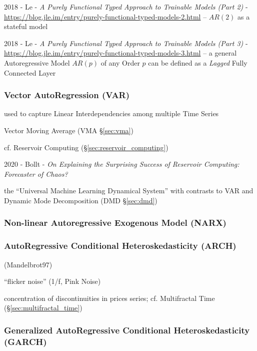 2018 - Le -
\emph{A Purely Functional Typed Approach to Trainable Models (Part 2)} -
\url{https://blog.jle.im/entry/purely-functional-typed-models-2.html}
-- $AR(2)$ as a stateful model

2018 - Le -
\emph{A Purely Functional Typed Approach to Trainable Models (Part 3)} -
\url{https://blog.jle.im/entry/purely-functional-typed-models-3.html}
-- a general Autoregressive Model $AR(p)$ of any Order $p$ can be defined as a
\emph{Lagged} Fully Connected Layer




\subsubsection{Vector AutoRegression (VAR)}\label{sec:var}

used to capture Linear Interdependencies among multiple Time Series

Vector Moving Average (VMA \S\ref{sec:vma})

cf. Reservoir Computing (\S\ref{sec:reservoir_computing})

2020 - Bollt - \emph{On Explaining the Surprising Success of Reservoir
  Computing: Forecaster of Chaos?}

the ``Universal Machine Learning Dynamical System'' with contrasts to VAR and
Dynamic Mode Decomposition (DMD \S\ref{sec:dmd})



\subsubsection{Non-linear Autoregressive Exogenous Model (NARX)}\label{sec:narx}

\subsubsection{AutoRegressive Conditional Heteroskedasticity (ARCH)}
\label{sec:arch}

(Mandelbrot97)

``flicker noise'' (1/f, Pink Noise)

concentration of discontinuities in prices series; cf. Multifractal Time
(\S\ref{sec:multifractal_time})



\subsubsection{Generalized AutoRegressive Conditional Heteroskedasticity (GARCH)}
\label{sec:garch}



